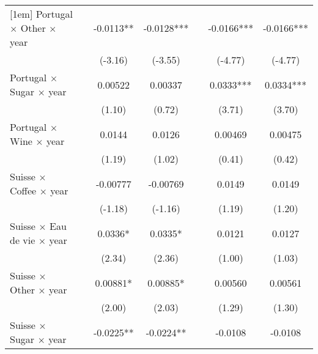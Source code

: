 {\begin{tabular}{l*{6}{c}}
[1em]
Portugal $\times$ Other $\times$ year&                     &     -0.0113** &     -0.0128***&                     &     -0.0166***&     -0.0166***\\
                    &                     &     (-3.16)         &     (-3.55)         &                     &     (-4.77)         &     (-4.77)         \\
[1em]
Portugal $\times$ Sugar $\times$ year&                     &     0.00522         &     0.00337         &                     &      0.0333***&      0.0334***\\
                    &                     &      (1.10)         &      (0.72)         &                     &      (3.71)         &      (3.70)         \\
[1em]
Portugal $\times$ Wine $\times$ year&                     &      0.0144         &      0.0126         &                     &     0.00469         &     0.00475         \\
                    &                     &      (1.19)         &      (1.02)         &                     &      (0.41)         &      (0.42)         \\
[1em]
Suisse $\times$ Coffee $\times$ year&                     &    -0.00777         &    -0.00769         &                     &      0.0149         &      0.0149         \\
                    &                     &     (-1.18)         &     (-1.16)         &                     &      (1.19)         &      (1.20)         \\
[1em]
Suisse $\times$ Eau de vie $\times$ year&                     &      0.0336*  &      0.0335*  &                     &      0.0121         &      0.0127         \\
                    &                     &      (2.34)         &      (2.36)         &                     &      (1.00)         &      (1.03)         \\
[1em]
Suisse $\times$ Other $\times$ year&                     &     0.00881*  &     0.00885*  &                     &     0.00560         &     0.00561         \\
                    &                     &      (2.00)         &      (2.03)         &                     &      (1.29)         &      (1.30)         \\
[1em]
Suisse $\times$ Sugar $\times$ year&                     &     -0.0225** &     -0.0224** &                     &     -0.0108         &     -0.0108         \\

\end{tabular}}
